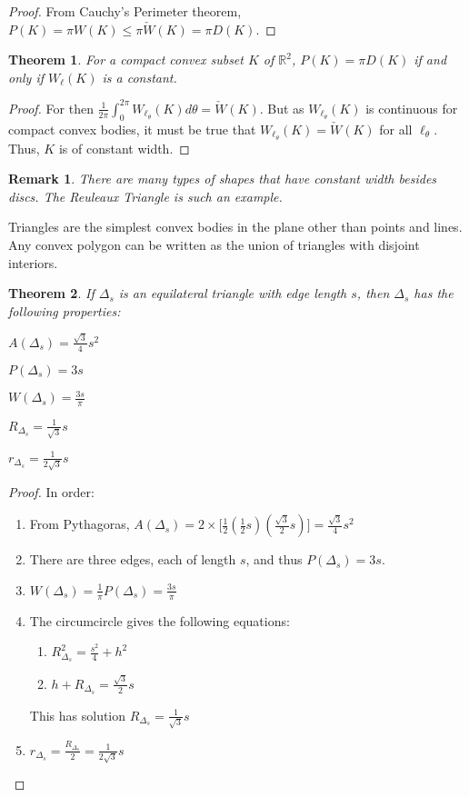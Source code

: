 \documentclass[crop=false,class=book]{standalone}
\theoremstyle{mystyle}
\newtheorem{theorem}{Theorem}[section]
\newtheorem{remark}{Remark}[section]
\begin{document}
\begin{proof}
From Cauchy's Perimeter theorem, $P(K) = \pi W(K) \leq \pi \check{W}(K) = \pi D(K)$.
\end{proof}
\begin{theorem}
For a compact convex subset $K$ of $\mathbb{R}^2$, $P(K) = \pi D(K)$ if and only if $W_{\ell}(K)$ is a constant.
\end{theorem}
\begin{proof}
For then $\frac{1}{2\pi} \int_{0}^{2\pi} W_{\ell_{\theta}}(K) d\theta = \check{W}(K)$. But as $W_{\ell_{\theta}}(K)$ is continuous for compact convex bodies, it must be true that $W_{\ell_{\theta}}(K) = \check{W}(K)$ for all $\ell_{\theta}$. Thus, $K$ is of constant width.
\end{proof}
\begin{remark}
There are many types of shapes that have constant width besides discs. The Reuleaux Triangle is such an example.
\end{remark}
Triangles are the simplest convex bodies in the plane other than points and lines. Any convex polygon can be written as the union of triangles with disjoint interiors. 
\begin{theorem}
If $\Delta_s$ is an equilateral triangle with edge length $s$, then $\Delta_s$ has the following properties:
\begin{enumerate}
\begin{multicols}{5}
\item $A(\Delta_s) = \frac{\sqrt{3}}{4}s^2$
\item $P(\Delta_s) = 3s$
\item $W(\Delta_s) = \frac{3s}{\pi}$
\item $R_{\Delta_s} = \frac{1}{\sqrt{3}}s$
\item $r_{\Delta_s} = \frac{1}{2\sqrt{3}}s$
\end{multicols}
\end{enumerate}
\end{theorem}
\begin{proof}
In order:
\begin{enumerate}
    \item From Pythagoras, $A(\Delta_s) =2\times\big[\frac{1}{2}(\frac{1}{2}s)(\frac{\sqrt{3}}{2}s)\big] = \frac{\sqrt{3}}{4}s^2$
    \item There are three edges, each of length $s$, and thus $P(\Delta_s) = 3s$.
    \item $W(\Delta_s) = \frac{1}{\pi}P(\Delta_s) = \frac{3s}{\pi}$
    \item The circumcircle gives the following equations:
    \begin{enumerate}
        \item $R_{\Delta_s}^2=\frac{s^2}{4}+h^2$
        \item $h+R_{\Delta_s} = \frac{\sqrt{3}}{2}s$
    \end{enumerate}
    This has solution $R_{\Delta_s}=\frac{1}{\sqrt{3}}s$
    \item $r_{\Delta_s} = \frac{R_{\Delta_s}}{2}= \frac{1}{2\sqrt{3}}s$
\end{enumerate}
\end{proof}
\end{document}
